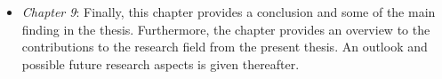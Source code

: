\begin{itemize}
	\item \textit{Chapter 9}: Finally, this chapter provides a conclusion and some of the main finding in the thesis. Furthermore, the chapter provides an overview to the contributions to the research field from the present thesis. An outlook and possible future research aspects is given thereafter.
	
\end{itemize}

